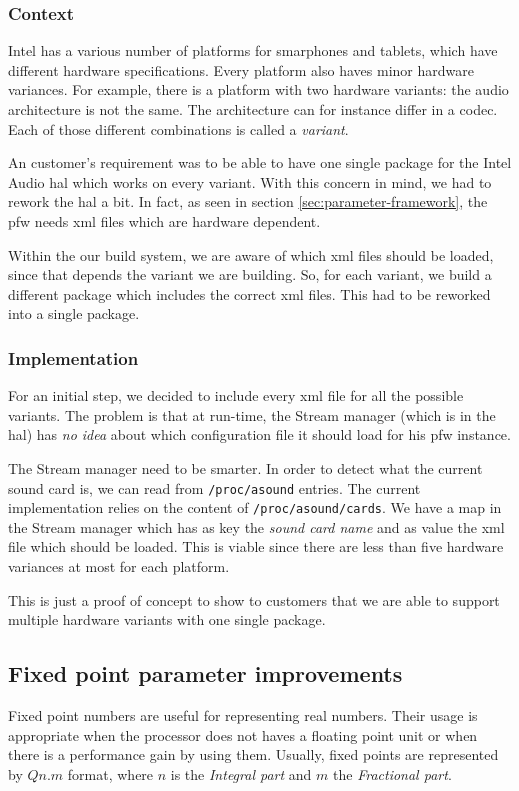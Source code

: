 \subsubsection{Context}
Intel has a various number of platforms for smarphones and tablets, which have different hardware specifications.
Every platform also haves minor hardware variances.
For example, there is a platform with two hardware variants: the audio architecture is not the same.
The architecture can for instance differ in a codec. Each of those different combinations is called a \emph{variant}.

An customer's requirement was to be able to have one single package for the Intel Audio \gls{hal} which works on every variant.
With this concern in mind, we had to rework the \gls{hal} a bit.
In fact, as seen in section \ref{sec:parameter-framework}, the \gls{pfw} needs \gls{xml} files which are hardware dependent.

Within the our build system, we are aware of which \gls{xml} files should be loaded, since that depends the variant we are building.
So, for each variant, we build a different package which includes the correct \gls{xml} files.
This had to be reworked into a single package.

\subsubsection{Implementation}
For an initial step, we decided to include every \gls{xml} file for all the possible variants.
The problem is that at run-time, the Stream manager (which is in the \gls{hal}) has \emph{no idea} about which configuration file
it should load for his \gls{pfw} instance.

The Stream manager need to be smarter. In order to detect what the current sound card is, we can read from \lstinline{/proc/asound} entries.
The current implementation relies on the content of \lstinline{/proc/asound/cards}.
We have a map in the Stream manager which has as key the \emph{sound card name} and as value the \gls{xml} file which should be loaded.
This is viable since there are less than five hardware variances at most for each platform.

This is just a proof of concept to show to customers that we are able to support multiple hardware variants with one single package.


\subsection{Fixed point parameter improvements}
Fixed point numbers are useful for representing real numbers. Their
usage is appropriate when the processor does not haves a floating point unit
or when there is a performance gain by using them. Usually, fixed points are
represented by $Qn.m$ format, where $n$ is the \emph{Integral part} and $m$ the
\emph{Fractional part}.

